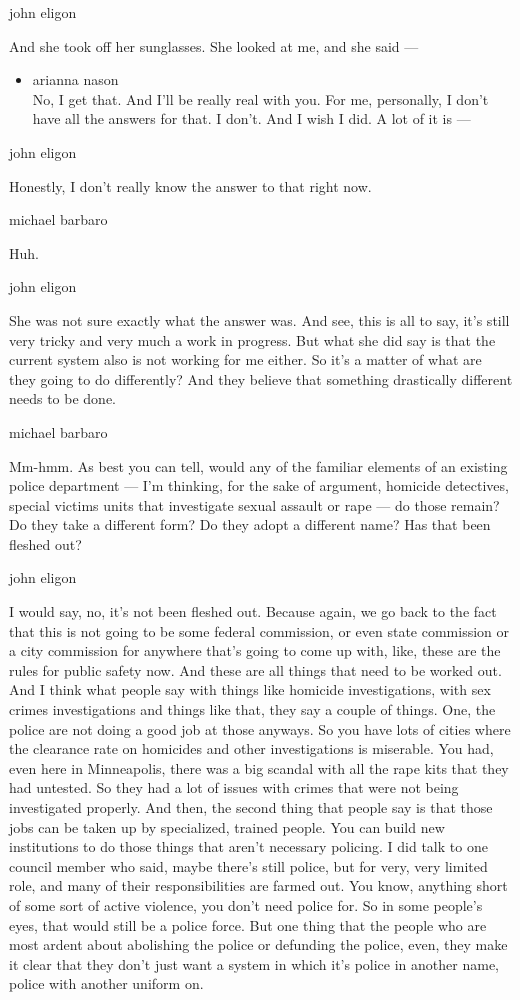 john eligon

And she took off her sunglasses. She looked at me, and she said ---

\begin{itemize}
\tightlist
\item
  arianna nason\\
  No, I get that. And I'll be really real with you. For me, personally,
  I don't have all the answers for that. I don't. And I wish I did. A
  lot of it is ---
\end{itemize}

john eligon

Honestly, I don't really know the answer to that right now.

michael barbaro

Huh.

john eligon

She was not sure exactly what the answer was. And see, this is all to
say, it's still very tricky and very much a work in progress. But what
she did say is that the current system also is not working for me
either. So it's a matter of what are they going to do differently? And
they believe that something drastically different needs to be done.

michael barbaro

Mm-hmm. As best you can tell, would any of the familiar elements of an
existing police department --- I'm thinking, for the sake of argument,
homicide detectives, special victims units that investigate sexual
assault or rape --- do those remain? Do they take a different form? Do
they adopt a different name? Has that been fleshed out?

john eligon

I would say, no, it's not been fleshed out. Because again, we go back to
the fact that this is not going to be some federal commission, or even
state commission or a city commission for anywhere that's going to come
up with, like, these are the rules for public safety now. And these are
all things that need to be worked out. And I think what people say with
things like homicide investigations, with sex crimes investigations and
things like that, they say a couple of things. One, the police are not
doing a good job at those anyways. So you have lots of cities where the
clearance rate on homicides and other investigations is miserable. You
had, even here in Minneapolis, there was a big scandal with all the rape
kits that they had untested. So they had a lot of issues with crimes
that were not being investigated properly. And then, the second thing
that people say is that those jobs can be taken up by specialized,
trained people. You can build new institutions to do those things that
aren't necessary policing. I did talk to one council member who said,
maybe there's still police, but for very, very limited role, and many of
their responsibilities are farmed out. You know, anything short of some
sort of active violence, you don't need police for. So in some people's
eyes, that would still be a police force. But one thing that the people
who are most ardent about abolishing the police or defunding the police,
even, they make it clear that they don't just want a system in which
it's police in another name, police with another uniform on.

